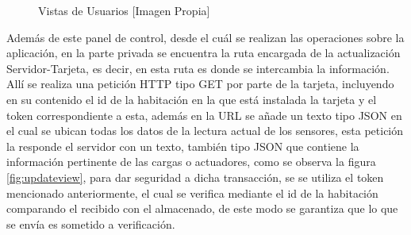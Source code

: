 \begin{figure}[H]
	\centering
	\caption{Vistas de Usuarios [Imagen Propia]}
	\label{fig:views}
\end{figure}

Además de este panel de control, desde el cuál se realizan las operaciones sobre la aplicación, en la parte privada se encuentra la ruta encargada de la actualización Servidor-Tarjeta, es decir, en esta ruta es donde se intercambia la información. Allí se realiza una petición HTTP tipo GET por parte de la tarjeta, incluyendo en su contenido el id de la habitación en la que está instalada la tarjeta y el token correspondiente a esta, además en la URL se añade un texto tipo JSON en el cual se ubican todas los datos de la lectura actual de los sensores, esta petición la responde el servidor con un texto, también tipo JSON que contiene la información pertinente de las cargas o actuadores, como se observa la figura \ref{fig:updateview}, para dar seguridad a dicha transacción, se se utiliza el token mencionado anteriormente, el cual se verifica mediante el id de la habitación comparando el recibido con el almacenado, de este modo se garantiza que lo que se envía es sometido a verificación.\\


